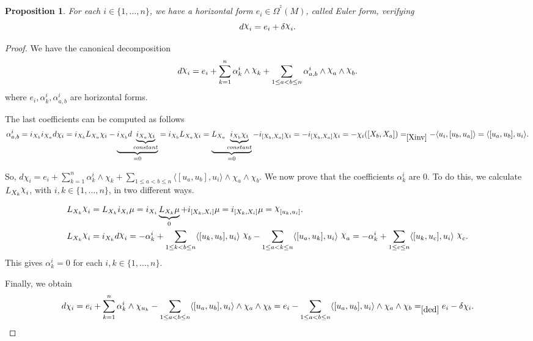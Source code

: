 \documentclass[a4paper,oneside,10pt,reqno]{amsart}
\newtheorem{proposition}[theorem]{Proposition}
\theoremstyle{definition}
\newcommand\chii{\raise2pt\hbox{$\chi$}}
\newcommand\Om{\Omega}
\newcommand{\coho}[3]{{#1}^{^{#2}}{\left( #3 \right)}}
\begin{document}
\begin{proposition}\label{ddelta}
For each  $i\in \{1,\ldots,n\}$,  we have a horizontal  form $e_i \in \coho  \Om 2  M$, called \emph{Euler form},  verifying
 \begin{equation}\label{bat}
d\chii_i =
e_i  + 
\delta \chii_i.
\end{equation}
\end{proposition}
\begin{proof}
We have the canonical decomposition 
$$
d\chii_{i} = e_i + \sum_{k=1}^n \alpha_k^i  \wedge \chii_{k} + \sum_{1\leq a <b\leq n} \alpha^i_{a,b} \wedge \chii_{a} \wedge \chii_{b}.
$$
where $e_i , \alpha_k^i ,  \alpha^i_{a,b} $ are horizontal forms.

The last coefficients  can be computed as follows
\begin{align*}
 \alpha^i_{a,b} =  i_{X_b}i_{X_a} d\chi_i  =  i_{X_b}L_{X_a}  \chi_i -  \underbrace{i_{X_b} d\underbrace{ i_{X_a} \chi_i }_{constant}}_{=0} 
 =  i_{X_b}L_{X_a}  \chi_i =  \underbrace{L_{X_a} \underbrace{ i_{X_b}  \chi_i}_{constant}}_{=0} -  i_{[X_b, X_a]}  \chi_i 
 =
 - i_{[X_b, X_a]}  \chi_i  = - \chi_i([X_b, X_a]) 
   =_{\eqref{Xinv}} - \langle u_i, [u_b,u_a]\rangle =  \langle[u_a,u_b],u_i\rangle.
 \end{align*} 
 
 So,
$
\displaystyle 
d\chi_i =
e_i+ \sum_{k=1}^n \alpha_k^i  \wedge\chi_{k} +
 \sum_{1\leq a <b\leq n}  \langle[u_a,u_b],u_i\rangle \wedge \chi_{a} \wedge \chi_{b}.
$
We  now prove  that the coefficients $\alpha_k^i$  are 0. To do this, we calculate $ L_{X_{k}} \chii_{i} $, with $i,k\in\{1, \ldots,n\}$,
 in two different ways.

\begin{align*}
L_{X_{k}} \chii_{i}&= L_{X_{k}} i_{X_{i}} \mu = i_{X_{i}}\underbrace{L_{X_{k}} \mu}_0   + i_{[X_{k},X_{i} ]} \mu 
 = i_{[X_{k},X_{i}]} \mu  = \chii_{[u_k,u_i]}. \\
L_{X_{k}} \chii_{i}&= i_{X_{k}} d\chii_i  =  -\alpha_k^i  +  \sum_{1\leq k <b\leq n} \langle[u_k,u_b],u_i\rangle\ \chii_{b} -   
 \sum_{1\leq a <k\leq n}  \langle[u_a,u_k],u_i\rangle\  \chii_{a} 
 =  - \alpha_k^i  +  \sum_{1\leq c\leq n} \langle[u_k,u_c],u_i\rangle  \ \chii_{c}.
\end{align*}
This gives $\alpha_k^i=0$ for each $i,k\in\{1, \ldots,n\}$.

 
Finally, we obtain
$$
d\chi_i = 
e_i+ \sum_{k=1}^n \alpha_k^i  \wedge \chi_{u_k} -
 \sum_{1\leq a <b\leq n}  \langle[u_a,u_b],u_i\rangle \wedge \chi_{a} \wedge \chi_{b}
 =
 e_i -
 \sum_{1\leq a <b\leq n}  \langle[u_a,u_b],u_i\rangle \wedge \chi_{a} \wedge \chi_{b}
=_{\eqref{ded}}
 e_i - \delta \chi_i. \qedhere
$$
 \end{proof}
\end{document}
